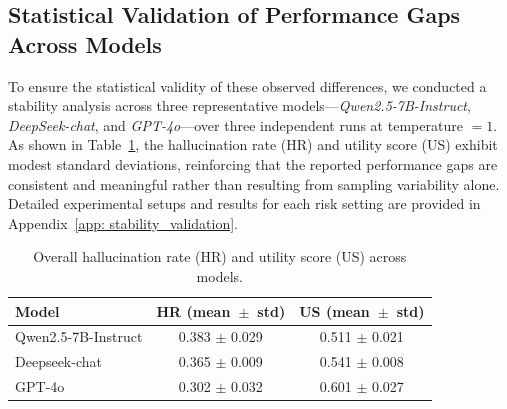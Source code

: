 \subsection{Statistical Validation of Performance Gaps Across Models}
To ensure the statistical validity of these observed differences, we conducted a stability analysis across three representative models---\textit{Qwen2.5-7B-Instruct}, \textit{DeepSeek-chat}, and \textit{GPT-4o}---over three independent runs at temperature $=1$. As shown in Table~\ref{tab:stability-summary}, the hallucination rate (HR) and utility score (US) exhibit modest standard deviations, reinforcing that the reported performance gaps are consistent and meaningful rather than resulting from sampling variability alone. Detailed experimental setups and results for each risk setting are provided in Appendix~\ref{app: stability_validation}.



\begin{table}
\centering
\begin{tabular}{lcc}
\toprule
\textbf{Model} & \textbf{HR (mean~$\pm$~std)} & \textbf{US (mean~$\pm$~std)} \\
\midrule
Qwen2.5-7B-Instruct & 0.383 $\pm$ 0.029 & 0.511 $\pm$ 0.021 \\
Deepseek-chat       & 0.365 $\pm$ 0.009 & 0.541 $\pm$ 0.008 \\
GPT-4o              & 0.302 $\pm$ 0.032 & 0.601 $\pm$ 0.027 \\
\bottomrule
\end{tabular}
\caption{Overall hallucination rate (HR) and utility score (US) across models.}
\label{tab:stability-summary}
\end{table}